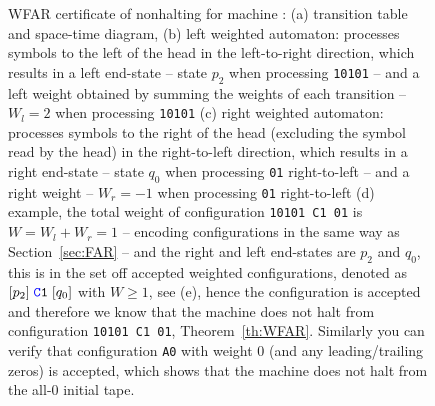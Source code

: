 \begin{figure}[h!]
\begin{minipage}[t]{0.71\textwidth}

    \end{minipage}

    \caption{WFAR certificate of nonhalting for machine : (a) transition table and space-time diagram, (b) left weighted automaton: processes symbols to the left of the head in the left-to-right direction, which results in a left end-state -- \eg state $p_2$ when processing \texttt{10101} -- and a left weight obtained by summing the weights of each transition -- \eg $W_l = 2$ when processing \texttt{10101} (c) right weighted automaton: processes symbols to the right of the head (excluding the symbol read by the head) in the right-to-left direction, which results in a right end-state -- \eg state $q_0$ when processing \texttt{01} right-to-left -- and a right weight -- \eg $W_r = -1$ when processing \texttt{01} right-to-left (d) example, the total weight of configuration \texttt{10101 C1 01} is $W=W_l+W_r = 1$ -- encoding configurations in the same way as Section~\ref{sec:FAR} -- and the right and left end-states are $p_2$ and $q_0$, this is in the set off accepted weighted configurations, denoted as $[p_2]\; \texttt{\stateC}\texttt{1}\; [q_0]$ with $W \geq 1$, see (e), hence the configuration is accepted and therefore we know that the machine does not halt from configuration \texttt{10101 C1 01}, Theorem~\ref{th:WFAR}. Similarly you can verify that configuration \texttt{A0} with weight $0$ (and any leading/trailing zeros) is accepted, which shows that the machine does not halt from the all-0 initial tape.}
\end{figure}
